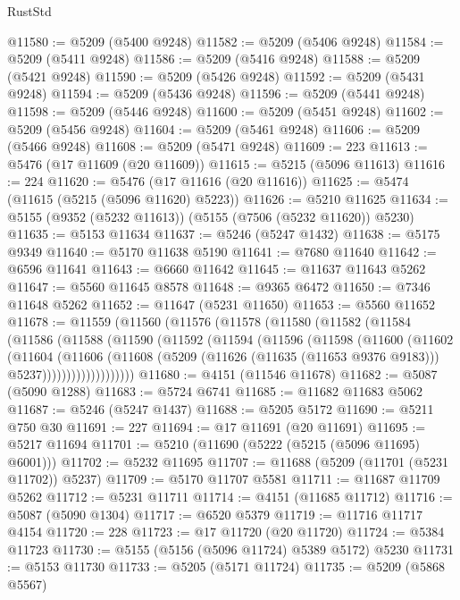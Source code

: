 \begin{lexlean}{RustStd}
\begin{coremodule}
@11580 := @5209 (@5400 @9248)
@11582 := @5209 (@5406 @9248)
@11584 := @5209 (@5411 @9248)
@11586 := @5209 (@5416 @9248)
@11588 := @5209 (@5421 @9248)
@11590 := @5209 (@5426 @9248)
@11592 := @5209 (@5431 @9248)
@11594 := @5209 (@5436 @9248)
@11596 := @5209 (@5441 @9248)
@11598 := @5209 (@5446 @9248)
@11600 := @5209 (@5451 @9248)
@11602 := @5209 (@5456 @9248)
@11604 := @5209 (@5461 @9248)
@11606 := @5209 (@5466 @9248)
@11608 := @5209 (@5471 @9248)
@11609 := 223
@11613 := @5476 (@17 @11609 (@20 @11609))
@11615 := @5215 (@5096 @11613)
@11616 := 224
@11620 := @5476 (@17 @11616 (@20 @11616))
@11625 := @5474 (@11615 (@5215 (@5096 @11620) @5223))
@11626 := @5210 @11625
@11634 := @5155 (@9352 (@5232 @11613)) (@5155 (@7506 (@5232 @11620)) @5230)
@11635 := @5153 @11634
@11637 := @5246 (@5247 @1432)
@11638 := @5175 @9349
@11640 := @5170 @11638 @5190
@11641 := @7680 @11640
@11642 := @6596 @11641
@11643 := @6660 @11642
@11645 := @11637 @11643 @5262
@11647 := @5560 @11645 @8578
@11648 := @9365 @6472
@11650 := @7346 @11648 @5262
@11652 := @11647 (@5231 @11650)
@11653 := @5560 @11652
@11678 := @11559
    (@11560
      (@11576
        (@11578
          (@11580
            (@11582
              (@11584
                (@11586
                  (@11588
                    (@11590
                      (@11592
                        (@11594
                          (@11596
                            (@11598
                              (@11600
                                (@11602
                                  (@11604
                                    (@11606
                                      (@11608
                                        (@5209
                                          (@11626 (@11635 (@11653 @9376 @9183)))
                                          @5237)))))))))))))))))))
@11680 := @4151 (@11546 @11678)
@11682 := @5087 (@5090 @1288)
@11683 := @5724 @6741
@11685 := @11682 @11683 @5062
@11687 := @5246 (@5247 @1437)
@11688 := @5205 @5172
@11690 := @5211 @750 @30
@11691 := 227
@11694 := @17 @11691 (@20 @11691)
@11695 := @5217 @11694
@11701 := @5210 (@11690 (@5222 (@5215 (@5096 @11695) @6001)))
@11702 := @5232 @11695
@11707 := @11688 (@5209 (@11701 (@5231 @11702)) @5237)
@11709 := @5170 @11707 @5581
@11711 := @11687 @11709 @5262
@11712 := @5231 @11711
@11714 := @4151 (@11685 @11712)
@11716 := @5087 (@5090 @1304)
@11717 := @6520 @5379
@11719 := @11716 @11717 @4154
@11720 := 228
@11723 := @17 @11720 (@20 @11720)
@11724 := @5384 @11723
@11730 := @5155 (@5156 (@5096 @11724) @5389 @5172) @5230
@11731 := @5153 @11730
@11733 := @5205 (@5171 @11724)
@11735 := @5209 (@5868 @5567)

\end{coremodule}
\end{lexlean}
